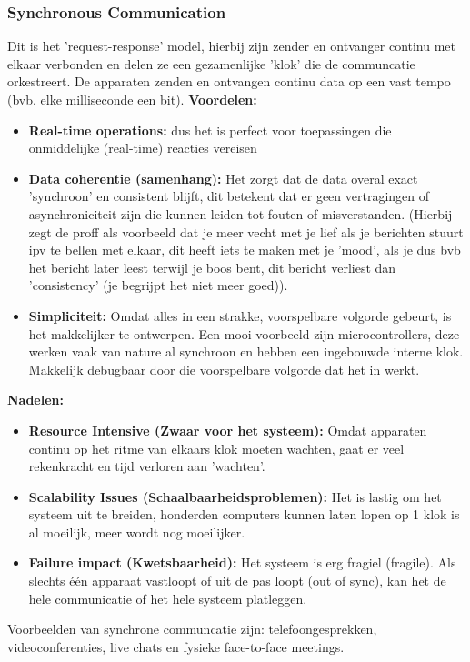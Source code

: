 \documentclass[a4paper,11pt,twoside]{report}
\begin{document}
\subsubsection{Synchronous Communication}
Dit is het 'request-response' model, hierbij zijn zender en ontvanger continu met elkaar verbonden
en delen ze een gezamenlijke 'klok' die de communcatie orkestreert. De apparaten zenden en ontvangen
continu data op een vast tempo (bvb. elke milliseconde een bit).
\newline
{\color{green}\textbf{Voordelen: }}
\begin{itemize}
    \item \textbf{Real-time operations:} dus het is perfect voor toepassingen die onmiddelijke
    (real-time) reacties vereisen
    \item \textbf{Data coherentie (samenhang):} Het zorgt dat de data overal exact 'synchroon' en
    consistent blijft, dit betekent dat er geen vertragingen of asynchroniciteit zijn die kunnen
    leiden tot fouten of misverstanden. (Hierbij zegt de proff als voorbeeld dat je meer vecht met
    je lief als je berichten stuurt ipv te bellen met elkaar, dit heeft iets te maken met je 'mood',
    als je dus bvb het bericht later leest terwijl je boos bent, dit bericht verliest dan
    'consistency' (je begrijpt het niet meer goed)).
    \item \textbf{Simpliciteit:} Omdat alles in een strakke, voorspelbare volgorde gebeurt, is het
    makkelijker te ontwerpen. Een mooi voorbeeld zijn microcontrollers, deze werken vaak van nature
    al synchroon en hebben een ingebouwde interne klok. Makkelijk debugbaar door die voorspelbare
    volgorde dat het in werkt.
\end{itemize}
{\color{red}\textbf{Nadelen: }}
\begin{itemize}
    \item \textbf{Resource Intensive (Zwaar voor het systeem):} Omdat apparaten continu op het ritme
    van elkaars klok moeten wachten, gaat er veel rekenkracht en tijd verloren aan 'wachten'.
    \item \textbf{Scalability Issues (Schaalbaarheidsproblemen):} Het is lastig om het systeem uit
    te breiden, honderden computers kunnen laten lopen op 1 klok is al moeilijk, meer wordt nog
    moeilijker.
    \item \textbf{Failure impact (Kwetsbaarheid):} Het systeem is erg fragiel (fragile). Als slechts
    één apparaat vastloopt of uit de pas loopt (out of sync), kan het de hele communicatie of het
    hele systeem platleggen.
\end{itemize}
Voorbeelden van synchrone communcatie zijn: telefoongesprekken, videoconferenties, live chats en
fysieke face-to-face meetings.
\end{document}
